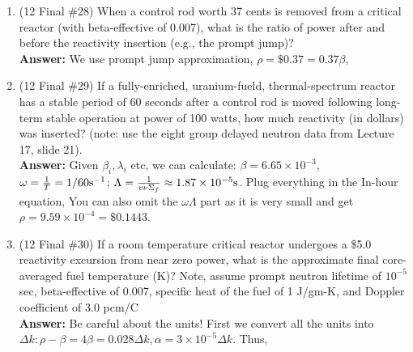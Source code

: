 \documentclass{school-22.211-notes}
\begin{document}
\begin{enumerate}
\begin{enumerate}
  \end{enumerate}

\item (12 Final \#28) When a control rod worth 37 cents is removed from a critical reactor (with beta-effective of 0.007), what is the ratio of power after and before the reactivity insertion (e.g., the prompt jump)? \\
\textbf{Answer:} We use prompt jump approximation, $\rho = \$ 0.37  = 0.37 \beta$, 


\item (12 Final \#29) If a fully-enriched, uranium-fueld, thermal-spectrum reactor has a stable period of 60 seconds after a control rod is moved following long-term stable operation at power of 100 watts, how much reactivity (in dollars) was inserted? (note: use the eight group delayed neutron data from Lecture 17, slide 21). \\
\textbf{Answer:} Given $\beta_i, \lambda_i$ etc, we can calculate:  $\beta = 6.65 \times 10^{-3}$, $\omega = \frac{1}{T} = 1/60 \mathrm{s}^{-1}$; $\Lambda = \frac{1}{v \nu \Sigma_f} \approx 1.87 \times 10^{-5} \mathrm{s}$. Plug everything in the In-hour equation, 
You can also omit the $\omega \Lambda$ part as it is very small and get $\rho= 9.59 \times 10^{-4} = \$0.1443$.
\item (12 Final \#30) If a room temperature critical reactor undergoes a \$5.0 reactivity excursion from near zero power, what is the approximate final core-averaged fuel temperature (K)? Note, assume prompt neutron lifetime of $10^{-5}$ sec, beta-effective of 0.007, specific heat of the fuel of 1 J/gm-K, and Doppler coefficient of 3.0 pcm/C \\
\textbf{Answer:} Be careful about the units! First we convert all the units into $\Delta k: \rho - \beta = 4 \beta = 0.028 \Delta k, \alpha = 3 \times 10^{-5} \Delta k$. Thus, 


\end{enumerate}
\end{document}
